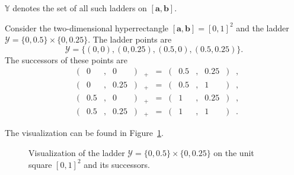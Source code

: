 $\mathbb{Y}$ denotes the set of all such ladders on
$[\boldsymbol{a},\boldsymbol{b}]$.

\begin{example}
    Consider the two-dimensional hyperrectangle $[\boldsymbol{a},\boldsymbol{b}] = [0,1]^2$ and the ladder $\mathcal{Y} = \{0, 0.5\} \times \{0, 0.25\}$. The ladder points are
    \begin{equation*}
        \mathcal{Y} = \{(0,0), (0,0.25), (0.5,0), (0.5,0.25)\}.
    \end{equation*}
    The successors of these points are
    \begin{equation*}
    \begin{alignedat}{7}
    &(& 0   &,& 0    &)&_+ &= &(& 0.5 &,& 0.25 &)&, \\
    &(& 0   &,& 0.25 &)&_+ &= &(& 0.5 &,& 1    &)&, \\
    &(& 0.5 &,& 0    &)&_+ &= &(& 1   &,& 0.25 &)&, \\
    &(& 0.5 &,& 0.25 &)&_+ &= &(& 1   &,& 1    &)&.
    \end{alignedat}
    \end{equation*}



    The visualization can be found in Figure~\ref{fig:ladder_example}.


    \begin{figure}
    \centering
    \caption{Visualization of the ladder $\mathcal{Y} = \{0, 0.5\} \times \{0, 0.25\}$ on the unit square $[0,1]^2$ and its successors.}
    \label{fig:ladder_example}
    \end{figure}
\end{example}

